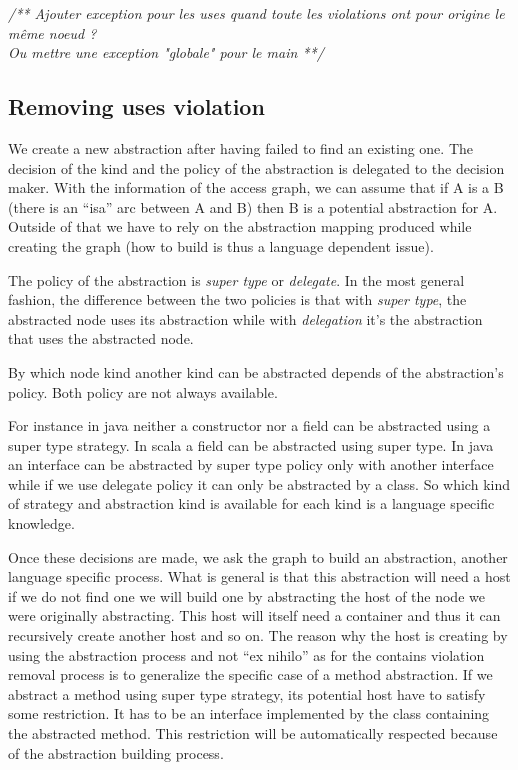 \documentclass[]{article}
\newcommand{\cmt}[1]{ {\color{light-gray}\it/** #1 **/} }
\begin{document}
\cmt{Ajouter exception pour les uses quand toute les violations ont pour origine le même noeud ?\\
Ou mettre une exception "globale" pour le main}

\subsection{Removing uses violation}
We create a new abstraction after having failed to find an existing one. The decision of the kind and the policy of the abstraction is delegated to the decision maker. With the information of the access graph, we can assume that if A is a B (there is an ``isa'' arc between A and B) then B is a potential abstraction for A. Outside of that we have to rely on the abstraction mapping produced while creating the graph (how to build is thus a language dependent issue).

The policy of the abstraction is \emph{super type} or \emph{delegate}. In the most general fashion, the difference between the two policies is that with \emph{super type}, the abstracted node uses its abstraction while with \emph{delegation} it's the abstraction that uses the abstracted node.

By which node kind another kind can be abstracted depends of the abstraction's policy. Both policy are not always available.

For instance in java neither a constructor nor a field can be abstracted using a super type strategy. In scala a field can be abstracted using super type.
In java an interface can be abstracted by super type policy only with another interface while if we use delegate policy it can only be abstracted by a class.
So which kind of strategy and abstraction kind is available for each kind is a language specific knowledge. 

 
Once these decisions are made, we ask the graph to build an abstraction, another language specific process. What is general is that this abstraction will need a host if we do not find one we will build one by abstracting the host of the node we were originally abstracting. This host will itself need a container and thus it can recursively create another host and so on.
The reason why the host is creating by using the abstraction process and not ``ex nihilo'' as for the contains violation removal process is to generalize the specific case of a method abstraction.
If we abstract a method using super type strategy, its potential host have to satisfy some restriction. It has to be an interface implemented by the class containing the abstracted method. This restriction will be automatically respected because of the abstraction building process.
\end{document}
